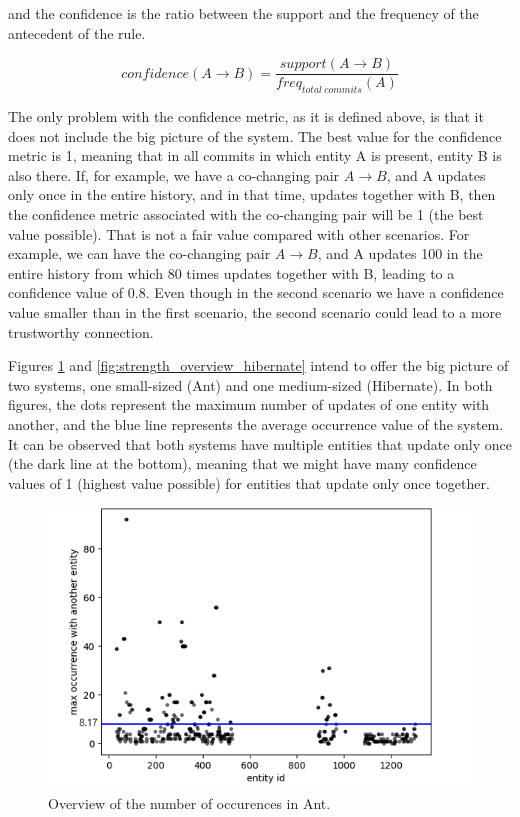 \documentclass[runningheads]{comsis2}
\begin{document}
and the confidence is the ratio between the support and the frequency of the antecedent of the rule.

\begin{equation}
confidence (A \rightarrow B) =\frac{support (A \rightarrow B) }{freq_{total\ commits}(A)}
\end{equation}


The only problem with the confidence metric, as it is defined above, is that it does not include the big picture of the system.
The best value for the confidence metric is 1, meaning that in all commits in which entity A is present, entity B is also there. If, for example, we have a co-changing pair $A \rightarrow B$, and A updates only once in the entire history, and in that time, updates together with B, then the confidence metric associated with the co-changing pair will be 1 (the best value possible). That is not a fair value compared with other scenarios. For example, we can have the co-changing pair $A \rightarrow B$, and A updates 100 in the entire history from which 80 times updates together with B, leading to a confidence value of 0.8.
Even though in the second scenario we have a confidence value smaller than in the first scenario, the second scenario could lead to a more trustworthy connection.

Figures \ref{fig:strength_overview_ant} and \ref{fig:strength_overview_hibernate}  intend to offer the big picture of two systems, one small-sized (Ant) and one medium-sized (Hibernate). In both figures, the dots represent the maximum number of updates of one entity with another, and the blue line represents the average occurrence value of the system.
It can be observed that both systems have multiple entities that update only once (the dark line at the bottom), meaning that we might have many confidence values of 1 (highest value possible) for entities that update only once together.

\begin{figure}
\centering
\includegraphics[scale=0.6]{fig_ant_maxOcc.png}
\caption{Overview of the number of occurences in Ant. }
\label{fig:strength_overview_ant}
\centering
\end{figure}
\end{document}
